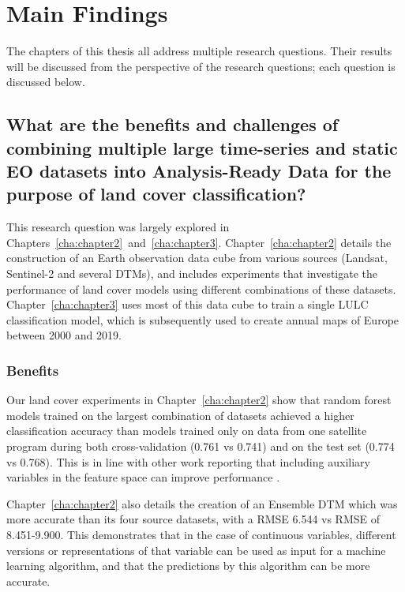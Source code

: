 \section{Main Findings}
    The chapters of this thesis all address multiple research questions. Their results will be discussed from the perspective of the research questions; each question is discussed below.
    
    \subsection{What are the benefits and challenges of combining multiple large time-series and static EO datasets into Analysis-Ready Data for the purpose of land cover classification?}
    \label{syn:rq1}

        This research question was largely explored in Chapters\@~\ref{cha:chapter2}\@~and\@~\ref{cha:chapter3}. Chapter\@~\ref{cha:chapter2} details the construction of an Earth observation data cube from various sources (Landsat, Sentinel-2 and several DTMs), and includes experiments that investigate the performance of land cover models using different combinations of these datasets. Chapter\@~\ref{cha:chapter3} uses most of this data cube to train a single LULC classification model, which is subsequently used to create annual maps of Europe between 2000 and 2019. 

        \subsubsection{Benefits}
    
            Our land cover experiments in Chapter\@~\ref{cha:chapter2} show that random forest models trained on the largest combination of datasets achieved a higher classification accuracy than models trained only on data from one satellite program during both cross-validation (0.761 vs 0.741) and on the test set (0.774 vs 0.768). This is in line with other work reporting that including auxiliary variables in the feature space can improve performance \citep{zhu2016optimizing, hurskainen2019auxiliary, hosseiny2022urban, santos2012multiscale}.

            Chapter\@~\ref{cha:chapter2} also details the creation of an Ensemble DTM which was more accurate than its four source datasets, with a RMSE 6.544 vs RMSE of 8.451-9.900. This demonstrates that in the case of continuous variables, different versions or representations of that variable can be used as input for a machine learning algorithm, and that the predictions by this algorithm can be more accurate.
            

